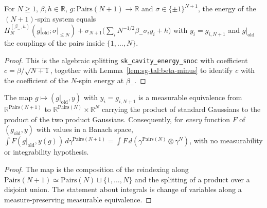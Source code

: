 \begin{lemma}
\label{lem:sg-tal:energy-cavity}
  \leanok
{}
For $N\ge1$, $\beta,h\in\mathbb R$, $g:\mathrm{Pairs}(N+1)\to\mathbb R$ and $\sigma\in\{\pm1\}^{N+1}$, the energy of the $(N+1)$-spin system equals
$H_N^{(\beta_-,h)}(g|_{\mathrm{old}};\sigma|_{\le N})+\sigma_{N+1}\bigl(\sum_i N^{-1/2}\beta_-\sigma_iy_i+h\bigr)$ with $y_i=g_{i,N+1}$ and $g|_{\mathrm{old}}$ the couplings of the pairs inside $\{1,\dots,N\}$.
\end{lemma}
\begin{proof}
  \leanok
This is the algebraic splitting \texttt{sk\_cavity\_energy\_snoc} with coefficient $c=\beta/\sqrt{N+1}$, together with Lemma~\ref{lem:sg-tal:beta-minus} to identify $c$ with the coefficient of the $N$-spin energy at $\beta_-$.
\end{proof}

\begin{proposition}
\label{lem:sg-tal:disorder-split}
  \leanok
{}
The map $g\mapsto(g|_{\mathrm{old}},y)$ with $y_i=g_{i,N+1}$ is a measurable equivalence from $\mathbb R^{\mathrm{Pairs}(N+1)}$ to $\mathbb R^{\mathrm{Pairs}(N)}\times\mathbb R^N$ carrying the product of standard Gaussians to the product of the two product Gaussians.  Consequently, for \emph{every} function $F$ of $(g_{\mathrm{old}},y)$ with values in a Banach space, $\int F(g|_{\mathrm{old}},y(g))\,d\gamma^{\mathrm{Pairs}(N+1)}=\int F\,d(\gamma^{\mathrm{Pairs}(N)}\otimes\gamma^N)$, with no measurability or integrability hypothesis.
\end{proposition}
\begin{proof}
  \leanok
The map is the composition of the reindexing along $\mathrm{Pairs}(N+1)\simeq\mathrm{Pairs}(N)\sqcup\{1,\dots,N\}$ and the splitting of a product over a disjoint union.  The statement about integrals is change of variables along a measure-preserving measurable equivalence.
\end{proof}

